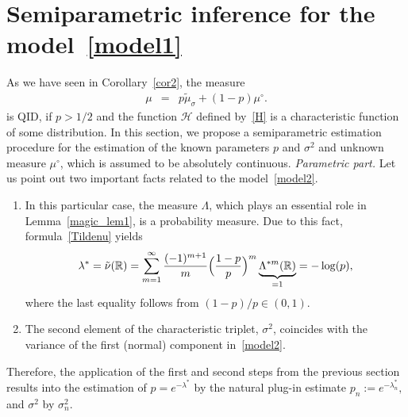\documentclass[a4paper,11pt]{article}
\theoremstyle{definition}
\newcommand{\R}{{\mathbb{R}}}
\newcommand{\1}{\mathbb{I}}
\def\R{\mathbb{R}}
\theoremstyle{remark}
\begin{document}
\section{Semiparametric inference for the model~\eqref{model1}}
\label{sec4}
As we have seen in Corollary~\ref{cor2}, the measure
\begin{eqnarray}\label{model2}
\mu &=&p  \tilde\mu_{\sigma} + (1-p) \mu^\circ.
\end{eqnarray}
 is QID, if \(p>1/2\) and the function \(\mathcal{H}\) defined by~\eqref{H} is a characteristic function of some distribution.  In this section, we propose a semiparametric estimation procedure for the estimation of the known parameters \(p\) and \(\sigma^2\) and unknown measure \(\mu^\circ \), which is assumed to be absolutely continuous. 
 \newline\newline
\!\!\!\textit{Parametric part.} Let us point out two important facts related to the model~\eqref{model2}.
\begin{enumerate}
\item  In this particular case, the measure \(\Lambda\), which plays an essential role in Lemma~\ref{magic_lem1}, is a probability measure. Due to this fact,  formula~\eqref{Tildenu} yields
\begin{eqnarray*}
\lambda^*=
\Tilde\nu (\R) = \sum_{m=1}^\infty \frac{(-1)^{m+1}}{m}
\Bigl( 
\frac{1-p}{p} 
\Bigr)^m \underbrace{\Lambda^{*m}(\R)}_{=1} = -\log(p), 
\end{eqnarray*}
where the last equality follows from \((1-p)/p \in (0,1).\)
\item The second element of the characteristic triplet, \(\sigma^2\), coincides with the variance of the first (normal) component in~\eqref{model2}.
\end{enumerate}
Therefore, the application of the first and second steps from the previous section results into the estimation of \(p = e^{-\lambda^*}\) by the natural plug-in estimate \(p_n := e^{-\lambda_n^*}, \) and \(\sigma^2\) by \(\sigma_n^2.\)
\end{document}
